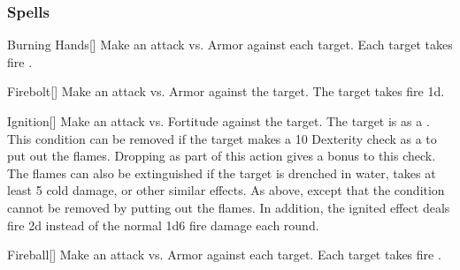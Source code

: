 \subsubsection{Spells}


\lowercase{\hypertarget{spell:Burning Hands}{}}\label{spell:Burning Hands}
\begin{freeability}[\nth{1}]{\hypertarget{spell:Burning Hands}{Burning Hands}}[]
Make an attack vs. Armor against each target.
\hit Each target takes fire .
\end{freeability}
\vspace{0.25em}



\lowercase{\hypertarget{spell:Firebolt}{}}\label{spell:Firebolt}
\begin{freeability}[\nth{1}]{\hypertarget{spell:Firebolt}{Firebolt}}[]
Make an attack vs. Armor against the target.
\hit The target takes fire  \plus1d.
\end{freeability}
\vspace{0.25em}



\lowercase{\hypertarget{spell:Ignition}{}}\label{spell:Ignition}
\begin{freeability}[\nth{1}]{\hypertarget{spell:Ignition}{Ignition}}[]
Make an attack vs. Fortitude against the target.
\hit The target is  as a .
This condition can be removed if the target makes a  10 Dexterity check as a  to put out the flames.
Dropping  as part of this action gives a  bonus to this check.
The flames can also be extinguished if the target is drenched in water, takes at least 5 cold damage, or other similar effects.
\crit As above, except that the condition cannot be removed by putting out the flames.
In addition, the ignited effect deals fire  \minus2d instead of the normal 1d6 fire damage each round.
\end{freeability}
\vspace{0.25em}



\lowercase{\hypertarget{spell:Fireball}{}}\label{spell:Fireball}
\begin{freeability}[\nth{2}]{\hypertarget{spell:Fireball}{Fireball}}[]
Make an attack vs. Armor against each target.
\hit Each target takes fire .
\end{freeability}
\vspace{0.25em}




